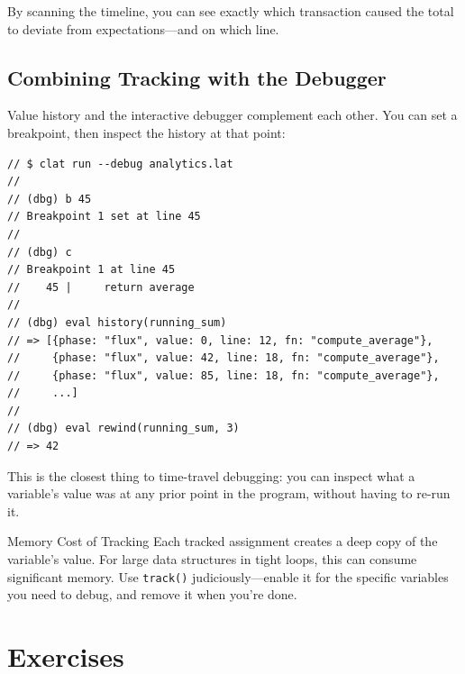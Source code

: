 By scanning the timeline, you can see exactly which transaction caused the total to deviate from expectations---and on which line.

\subsection{Combining Tracking with the Debugger}\label{sec:track-with-debug}

Value history and the interactive debugger complement each other.
You can set a breakpoint, then inspect the history at that point:

\begin{lstlisting}[language=Lattice, caption={Using track() with the CLI debugger}]
// $ clat run --debug analytics.lat
//
// (dbg) b 45
// Breakpoint 1 set at line 45
//
// (dbg) c
// Breakpoint 1 at line 45
//    45 |     return average
//
// (dbg) eval history(running_sum)
// => [{phase: "flux", value: 0, line: 12, fn: "compute_average"},
//     {phase: "flux", value: 42, line: 18, fn: "compute_average"},
//     {phase: "flux", value: 85, line: 18, fn: "compute_average"},
//     ...]
//
// (dbg) eval rewind(running_sum, 3)
// => 42
\end{lstlisting}

This is the closest thing to time-travel debugging: you can inspect what a variable's value was at any prior point in the program, without having to re-run it.

\begin{warnbox}{Memory Cost of Tracking}
Each tracked assignment creates a deep copy of the variable's value.
For large data structures in tight loops, this can consume significant memory.
Use \lstinline|track()| judiciously---enable it for the specific variables you need to debug, and remove it when you're done.
\end{warnbox}

\section*{Exercises}\label{sec:debugging-exercises}

